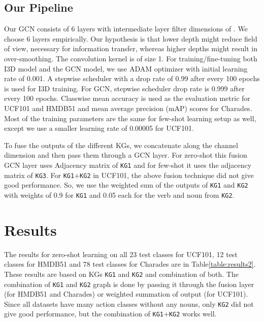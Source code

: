 \subsection{Our Pipeline}
Our GCN consists of 6 layers with intermediate layer filter dimensions of . We choose 6 layers empirically. Our hypothesis is that lower depth might reduce field of view, necessary for information transfer, whereas higher depths might result in over-smoothing. The convolution kernel is of size 1. For training/fine-tuning both I3D model and the GCN model, we use ADAM optimizer with initial learning rate of 0.001. A stepwise scheduler with a drop rate of 0.99 after every 100 epochs is used for I3D training. For GCN, stepwise scheduler drop rate is 0.999 after every 100 epochs. Classwise mean accuracy is used as the evaluation metric for UCF101 and HMDB51 and mean average precision (mAP) scores for Charades. Most of the training parameters are the same for few-shot learning setup as well, except we use a smaller learning rate of 0.00005 for UCF101.

To fuse the outputs of the different KGs, we concatenate along the channel dimension and then pass them through a GCN layer. For zero-shot this fusion GCN layer uses Adjacency matrix of \texttt{KG1} and for few-shot it uses the adjacency matrix of \texttt{KG3}. For \texttt{KG1}+\texttt{KG2} in UCF101, the above fusion technique did not give good performance. So, we use the weighted sum of the outputs of \texttt{KG1} and \texttt{KG2} with weights of 0.9 for \texttt{KG1} and 0.05 each for the verb and noun from \texttt{KG2}.

 \section{Results}
\label{results}

The results for zero-shot learning on all 23 test classes for UCF101, 12 test classes for HMDB51 and 78 test classes for Charades are in Table\ref{table:results2}. These results are based on KGs \texttt{KG1} and \texttt{KG2} and combination of both. The combination of \texttt{KG1} and \texttt{KG2} graph is done by passing it through the fusion layer (for HMDB51 and Charades) or weighted summation of output (for UCF101). Since all datasets have many action classes without any nouns, only \texttt{KG2} did not give good performance, but the combination of \texttt{KG1}+\texttt{KG2} works well.

